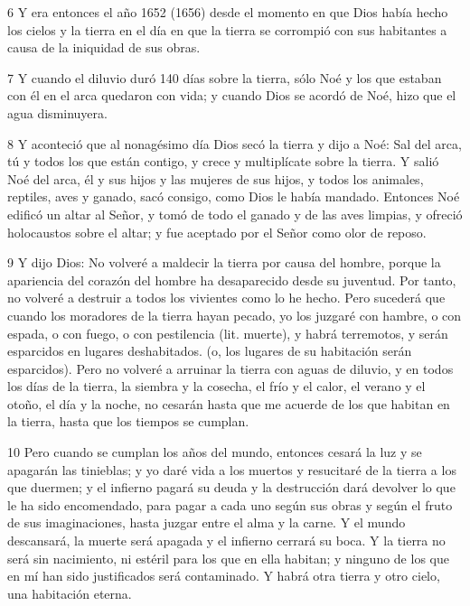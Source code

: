 \par 6 Y era entonces el año 1652 (1656) desde el momento en que Dios había hecho los cielos y la tierra en el día en que la tierra se corrompió con sus habitantes a causa de la iniquidad de sus obras.

\par 7 Y cuando el diluvio duró 140 días sobre la tierra, sólo Noé y los que estaban con él en el arca quedaron con vida; y cuando Dios se acordó de Noé, hizo que el agua disminuyera.

\par 8 Y aconteció que al nonagésimo día Dios secó la tierra y dijo a Noé: Sal del arca, tú y todos los que están contigo, y crece y multiplícate sobre la tierra. Y salió Noé del arca, él y sus hijos y las mujeres de sus hijos, y todos los animales, reptiles, aves y ganado, sacó consigo, como Dios le había mandado. Entonces Noé edificó un altar al Señor, y tomó de todo el ganado y de las aves limpias, y ofreció holocaustos sobre el altar; y fue aceptado por el Señor como olor de reposo.

\par 9 Y dijo Dios: No volveré a maldecir la tierra por causa del hombre, porque la apariencia del corazón del hombre ha desaparecido desde su juventud. Por tanto, no volveré a destruir a todos los vivientes como lo he hecho. Pero sucederá que cuando los moradores de la tierra hayan pecado, yo los juzgaré con hambre, o con espada, o con fuego, o con pestilencia (lit. muerte), y habrá terremotos, y serán esparcidos en lugares deshabitados. (o, los lugares de su habitación serán esparcidos). Pero no volveré a arruinar la tierra con aguas de diluvio, y en todos los días de la tierra, la siembra y la cosecha, el frío y el calor, el verano y el otoño, el día y la noche, no cesarán hasta que me acuerde de los que habitan en la tierra, hasta que los tiempos se cumplan.

\par 10 Pero cuando se cumplan los años del mundo, entonces cesará la luz y se apagarán las tinieblas; y yo daré vida a los muertos y resucitaré de la tierra a los que duermen; y el infierno pagará su deuda y la destrucción dará devolver lo que le ha sido encomendado, para pagar a cada uno según sus obras y según el fruto de sus imaginaciones, hasta juzgar entre el alma y la carne. Y el mundo descansará, la muerte será apagada y el infierno cerrará su boca. Y la tierra no será sin nacimiento, ni estéril para los que en ella habitan; y ninguno de los que en mí han sido justificados será contaminado. Y habrá otra tierra y otro cielo, una habitación eterna.

